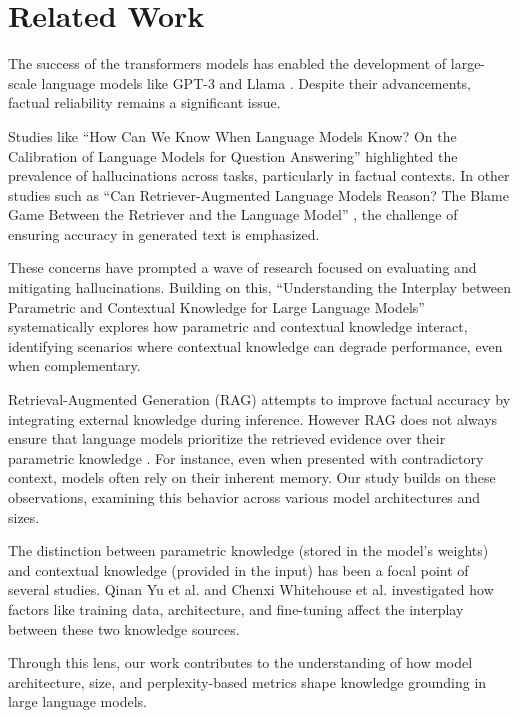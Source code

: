 \section{Related Work}

The success of the transformers models \cite{attention_is_all_you_need} has enabled the development of large-scale language models like GPT-3 \cite{gpt3} and Llama \cite{llama}.
Despite their advancements, factual reliability remains a significant issue.

Studies like ``How Can We Know When Language Models Know? On the Calibration of Language Models for Question Answering'' \cite{how_can_we_know} highlighted the prevalence of hallucinations across tasks, particularly in factual contexts.
In other studies such as ``Can Retriever-Augmented Language Models Reason? The Blame Game Between the Retriever and the Language Model'' \cite{can_rag_models_reason}, the challenge of ensuring accuracy in generated text is emphasized.

These concerns have prompted a wave of research focused on evaluating and mitigating hallucinations.
Building on this, ``Understanding the Interplay between Parametric and Contextual Knowledge for Large Language Models'' \cite{understanding_the_interplay} systematically explores how parametric and contextual knowledge interact, identifying scenarios where contextual knowledge can degrade performance, even when complementary.

Retrieval-Augmented Generation (RAG) \cite{rag} attempts to improve factual accuracy by integrating external knowledge during inference.
However RAG does not always ensure that language models prioritize the retrieved evidence over their parametric knowledge \cite{ragged,factual_recall}.
For instance, even when presented with contradictory context, models often rely on their inherent memory.
Our study builds on these observations, examining this behavior across various model architectures and sizes.

The distinction between parametric knowledge (stored in the model's weights) and contextual knowledge (provided in the input) has been a focal point of several studies.
Qinan Yu et al. \cite{factual_recall} and Chenxi Whitehouse et al. \cite{knowledge_grounding_retrieval_augmented} investigated how factors like training data, architecture, and fine-tuning affect the interplay between these two knowledge sources.

Through this lens, our work contributes to the understanding of how model architecture, size, and perplexity-based metrics shape knowledge grounding in large language models.

